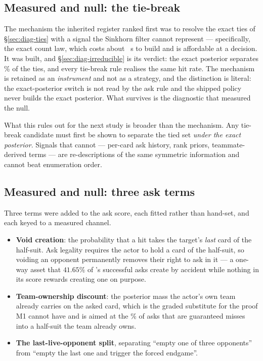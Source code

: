 \subsection{Measured and null: the tie-break}
\label{sec:mech-tiebreak}

The mechanism the inherited register ranked first was to resolve the exact ties of
\S\ref{sec:diag-ties} with a signal the Sinkhorn filter cannot represent --- specifically, the exact
count law, which costs about \vsixExactBuildUsFive{}~\textmu s to build and is affordable at a
decision. It was built, and \S\ref{sec:diag-irreducible} is its verdict: the exact posterior
separates \vsixTieExactSepPctFive\% of the ties, and every tie-break rule realises the same hit
rate. The mechanism is retained as an \emph{instrument} and not as a strategy, and the distinction is
literal: the exact-posterior switch is not read by the ask rule and the shipped policy never builds
the exact posterior. What survives is the diagnostic that measured the null.

What this rules out for the next study is broader than the mechanism. Any tie-break candidate must
first be shown to separate the tied set \emph{under the exact posterior}. Signals that cannot ---
per-card ask history, rank priors, teammate-derived terms --- are re-descriptions of the same
symmetric information and cannot beat enumeration order.

\subsection{Measured and null: three ask terms}
\label{sec:mech-knowledge}

Three terms were added to the ask score, each fitted rather than hand-set, and each keyed to a
measured channel.

\begin{itemize}
\item \textbf{Void creation}: the probability that a hit takes the target's \emph{last} card of the
  half-suit. Ask legality requires the actor to hold a card of the half-suit, so voiding an opponent
  permanently removes their right to ask in it --- a one-way asset that $41.65\%$ of \vfive{}'s
  successful asks create by accident while nothing in its score rewards creating one on purpose.
\item \textbf{Team-ownership discount}: the posterior mass the actor's own team already carries on
  the asked card, which is the graded substitute for the proof M1 cannot have and is aimed at the
  \vsixPathFiveOwnlocked\% of asks that are guaranteed misses into a half-suit the team already owns.
\item \textbf{The last-live-opponent split}, separating ``empty one of three opponents'' from
  ``empty the last one and trigger the forced endgame''.
\end{itemize}


